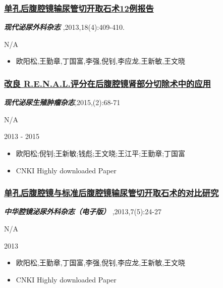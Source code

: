 \documentclass[]{article}
\providecommand{\tightlist}{%
  \setlength{\itemsep}{0pt}\setlength{\parskip}{0pt}}
\begin{document}
\hypertarget{ux5355ux5b54ux540eux8179ux8154ux955cux8f93ux5c3fux7ba1ux5207ux5f00ux53d6ux77f3ux672f12ux4f8bux62a5ux544a}{%
\subsubsection{\texorpdfstring{\href{https://doi.org/10.3969/j.issn.1009-8291.2013.04.039}{单孔后腹腔镜输尿管切开取石术12例报告}}{单孔后腹腔镜输尿管切开取石术12例报告}}\label{ux5355ux5b54ux540eux8179ux8154ux955cux8f93ux5c3fux7ba1ux5207ux5f00ux53d6ux77f3ux672f12ux4f8bux62a5ux544a}}

\emph{\textbf{现代泌尿外科杂志}} ,2013,18(4):409-410.

N/A

\begin{itemize}
\tightlist
\item
  欧阳松,王勤章,丁国富,李强,倪钊,李应龙,王新敏,王文晓
\end{itemize}

\hypertarget{ux6539ux826f-r.e.n.a.l.ux8bc4ux5206ux5728ux540eux8179ux8154ux955cux80beux90e8ux5206ux5207ux9664ux672fux4e2dux7684ux5e94ux7528}{%
\subsubsection{\texorpdfstring{\href{https://doi.org/10.3870/j.jssn.1674-4624.2015.02.002}{改良
R.E.N.A.L.评分在后腹腔镜肾部分切除术中的应用}}{改良 R.E.N.A.L.评分在后腹腔镜肾部分切除术中的应用}}\label{ux6539ux826f-r.e.n.a.l.ux8bc4ux5206ux5728ux540eux8179ux8154ux955cux80beux90e8ux5206ux5207ux9664ux672fux4e2dux7684ux5e94ux7528}}

\emph{\textbf{现代泌尿生殖肿瘤杂志}},2015,(2):68-71

N/A

2013 - 2015

\begin{itemize}
\tightlist
\item
  欧阳松;倪钊;王新敏;钱彪;王文晓;王江平;王勤章;丁国富
\item
   CNKI Highly downloaded Paper
\end{itemize}

\hypertarget{ux5355ux5b54ux540eux8179ux8154ux955cux4e0eux6807ux51c6ux540eux8179ux8154ux955cux8f93ux5c3fux7ba1ux5207ux5f00ux53d6ux77f3ux672fux7684ux5bf9ux6bd4ux7814ux7a76}{%
\subsubsection{\texorpdfstring{\href{https://doi.org/10.3969/cma.j.issn.1674-3253.2013.05.007}{单孔后腹腔镜与标准后腹腔镜输尿管切开取石术的对比研究}}{单孔后腹腔镜与标准后腹腔镜输尿管切开取石术的对比研究}}\label{ux5355ux5b54ux540eux8179ux8154ux955cux4e0eux6807ux51c6ux540eux8179ux8154ux955cux8f93ux5c3fux7ba1ux5207ux5f00ux53d6ux77f3ux672fux7684ux5bf9ux6bd4ux7814ux7a76}}

\emph{\textbf{中华腔镜泌尿外科杂志（电子版）}} ,2013,7(5):24-27

N/A

2013

\begin{itemize}
\tightlist
\item
  欧阳松,王勤章,丁国富,李强,倪钊,李应龙,王新敏,王文晓
\item
   CNKI Highly downloaded Paper
\end{itemize}
\end{document}
